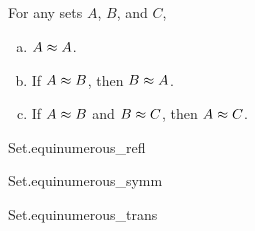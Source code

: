 \documentclass{report}
\begin{document}
\subsection{}%

  \begin{theorem}[6A]
    For any sets $A$, $B$, and $C$,
      \begin{enumerate}[(a)]
        \item $A \approx A$.
        \item If $A \approx B$, then $B \approx A$.
        \item If $A \approx B$ and $B \approx C$, then $A \approx C$.
      \end{enumerate}
  \end{theorem}

    {Set.equinumerous\_refl}

    {Set.equinumerous\_symm}

    {Set.equinumerous\_trans}
\end{document}
